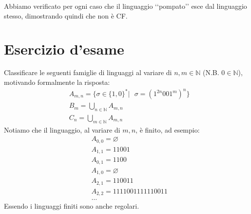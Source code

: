 \documentclass[a4paper,oneside]{scrbook}
\newcommand{\greenmark}{\quad \textcolor{green}{\checkmark}}
\begin{document}
Abbiamo verificato per ogni caso che il linguaggio ‘‘pompato’’ esce dal linguaggio stesso, dimostrando quindi che non è CF. \greenmark

\chapter{Esercizio d'esame}
Classificare le seguenti famiglie di linguaggi al variare di $n,m \in \mathbb{N}$ (N.B. $0\in\mathbb{N}$), motivando formalmente la risposta:
\begin{align*}
	&A_{m,n}=\{ \sigma \in \{1,0\}^* | \text{ } \sigma = (1^{2n}001^m)^n \}\\
	&B_m = \bigcup_{n\in\mathbb{N}} A_{m,n}\\
	&C_n = \bigcup_{m\in\mathbb{N}} A_{m,n}
\end{align*}
Notiamo che il linguaggio, al variare di $m,n$, è finito, ad esempio:
\begin{align*}
	&A_{0,0}=\varnothing\\
	&A_{1,1}=11001\\
	&A_{0,1}=1100\\
	&A_{1,0}=\varnothing\\
	&A_{2,1}=110011\\
	&A_{2,2}=1111001111110011\\
	&\dots
\end{align*}
Essendo i linguaggi finiti sono anche regolari.
\end{document}
